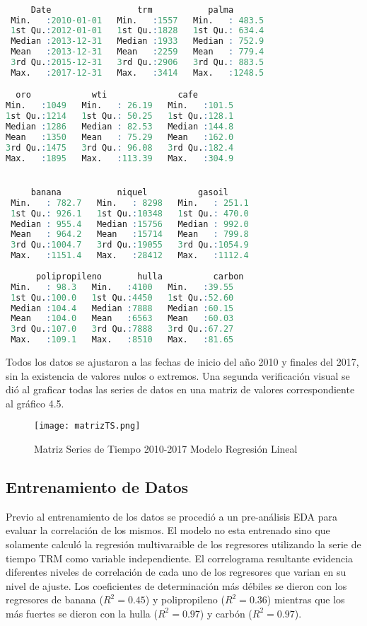 \begin{lstlisting}[language=R]

     Date                 trm           palma
 Min.   :2010-01-01   Min.   :1557   Min.   : 483.5   
 1st Qu.:2012-01-01   1st Qu.:1828   1st Qu.: 634.4   
 Median :2013-12-31   Median :1933   Median : 752.9   
 Mean   :2013-12-31   Mean   :2259   Mean   : 779.4   
 3rd Qu.:2015-12-31   3rd Qu.:2906   3rd Qu.: 883.5   
 Max.   :2017-12-31   Max.   :3414   Max.   :1248.5   

  oro            wti              cafe      
Min.   :1049   Min.   : 26.19   Min.   :101.5  
1st Qu.:1214   1st Qu.: 50.25   1st Qu.:128.1  
Median :1286   Median : 82.53   Median :144.8  
Mean   :1350   Mean   : 75.29   Mean   :162.0  
3rd Qu.:1475   3rd Qu.: 96.08   3rd Qu.:182.4  
Max.   :1895   Max.   :113.39   Max.   :304.9  


     banana           niquel          gasoil       
 Min.   : 782.7   Min.   : 8298   Min.   : 251.1   
 1st Qu.: 926.1   1st Qu.:10348   1st Qu.: 470.0   
 Median : 955.4   Median :15756   Median : 992.0   
 Mean   : 964.2   Mean   :15714   Mean   : 799.8   
 3rd Qu.:1004.7   3rd Qu.:19055   3rd Qu.:1054.9   
 Max.   :1151.4   Max.   :28412   Max.   :1112.4   
 
      polipropileno       hulla          carbon     
 Min.   : 98.3   Min.   :4100   Min.   :39.55  
 1st Qu.:100.0   1st Qu.:4450   1st Qu.:52.60  
 Median :104.4   Median :7888   Median :60.15  
 Mean   :104.0   Mean   :6563   Mean   :60.03  
 3rd Qu.:107.0   3rd Qu.:7888   3rd Qu.:67.27  
 Max.   :109.1   Max.   :8510   Max.   :81.65  
\end{lstlisting}

Todos los datos se ajustaron a las fechas de inicio del año 2010 y finales del 2017, sin la existencia de valores nulos o extremos. Una segunda verificación visual se dió al graficar todas las series de datos en una matriz de valores correspondiente al gráfico 4.5. 

\begin{figure}[H]
    \centering
    \texttt{[image: matrizTS.png]}
    \caption{Matriz Series de Tiempo 2010-2017 Modelo Regresión Lineal}
\end{figure}   

\subsection{Entrenamiento de Datos}
Previo al entrenamiento de los datos se procedió a un pre-análisis EDA para evaluar la correlación de los mismos. El modelo no esta entrenado sino que solamente calculó la regresión multivaraible de los regresores utilizando la serie de tiempo TRM como variable independiente. El correlograma resultante evidencia diferentes niveles de correlación de cada uno de los regresores que varian en su nivel de ajuste. Los coeficientes de determinación más débiles se dieron con los regresores de banana ($R^2 = 0.45$) y polipropileno ($R^2 = 0.36$) mientras que los más fuertes se dieron con la hulla ($R^2 = 0.97$) y carbón ($R^2 = 0.97$).

